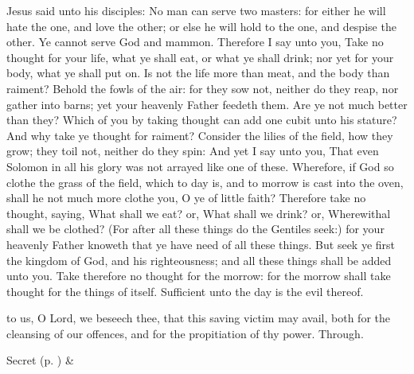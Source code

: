  Jesus said unto his disciples: No man can serve two masters: for either he will hate the one, and love the other; or else he will hold to the one, and despise the other. Ye cannot serve God and mammon. Therefore I say unto you, Take no thought for your life, what ye shall eat, or what ye shall drink; nor yet for your body, what ye shall put on. Is not the life more than meat, and the body than raiment? Behold the fowls of the air: for they sow not, neither do they reap, nor gather into barns; yet your heavenly Father feedeth them. Are ye not much better than they? Which of you by taking thought can add one cubit unto his stature? And why take ye thought for raiment? Consider the lilies of the field, how they grow; they toil not, neither do they spin: And yet I say unto you, That even Solomon in all his glory was not arrayed like one of these. Wherefore, if God so clothe the grass of the field, which to day is, and to morrow is cast into the oven, shall he not much more clothe you, O ye of little faith? Therefore take no thought, saying, What shall we eat? or, What shall we drink? or, Wherewithal shall we be clothed? (For after all these things do the Gentiles seek:) for your heavenly Father knoweth that ye have need of all these things. But seek ye first the kingdom of God, and his righteousness; and all these things shall be added unto you. Take therefore no thought for the morrow: for the morrow shall take thought for the things of itself. Sufficient unto the day is the evil thereof.


\vspace{-0.3\baselineskip}

\secret
{} to us, O Lord, we beseech thee, that this saving victim may avail, both for the cleansing of our offences, and for the propitiation of thy power. Through.
\begin{rubric}
     Secret  (p. \pageref{SPSaints}) \&  
\end{rubric}


\vspace{-0.3\baselineskip}


